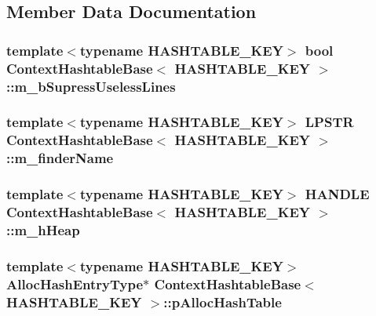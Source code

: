 \subsection{Member Data Documentation}
\hypertarget{class_context_hashtable_base_a5cfe6a5ef2651d399a5b5a9b7d4f2b3d}{
\subsubsection[{m\-\_\-b\-Supress\-Useless\-Lines}]{\setlength{\rightskip}{0pt plus 5cm}template$<$typename H\-A\-S\-H\-T\-A\-B\-L\-E\-\_\-\-K\-E\-Y$>$ bool {\bf Context\-Hashtable\-Base}$<$ H\-A\-S\-H\-T\-A\-B\-L\-E\-\_\-\-K\-E\-Y $>$\-::m\-\_\-b\-Supress\-Useless\-Lines}}\label{class_context_hashtable_base_a5cfe6a5ef2651d399a5b5a9b7d4f2b3d}
\hypertarget{class_context_hashtable_base_ab01c5068209ba7f43ee1f8670f79c837}{
\subsubsection[{m\-\_\-finder\-Name}]{\setlength{\rightskip}{0pt plus 5cm}template$<$typename H\-A\-S\-H\-T\-A\-B\-L\-E\-\_\-\-K\-E\-Y$>$ L\-P\-S\-T\-R {\bf Context\-Hashtable\-Base}$<$ H\-A\-S\-H\-T\-A\-B\-L\-E\-\_\-\-K\-E\-Y $>$\-::m\-\_\-finder\-Name}}\label{class_context_hashtable_base_ab01c5068209ba7f43ee1f8670f79c837}
\hypertarget{class_context_hashtable_base_abd63115983bd666ee0cb09bc684ada65}{
\subsubsection[{m\-\_\-h\-Heap}]{\setlength{\rightskip}{0pt plus 5cm}template$<$typename H\-A\-S\-H\-T\-A\-B\-L\-E\-\_\-\-K\-E\-Y$>$ H\-A\-N\-D\-L\-E {\bf Context\-Hashtable\-Base}$<$ H\-A\-S\-H\-T\-A\-B\-L\-E\-\_\-\-K\-E\-Y $>$\-::m\-\_\-h\-Heap}}\label{class_context_hashtable_base_abd63115983bd666ee0cb09bc684ada65}
\hypertarget{class_context_hashtable_base_a22aba6b9cc816a9c69820dae9e06e5e2}{
\subsubsection[{p\-Alloc\-Hash\-Table}]{\setlength{\rightskip}{0pt plus 5cm}template$<$typename H\-A\-S\-H\-T\-A\-B\-L\-E\-\_\-\-K\-E\-Y$>$ Alloc\-Hash\-Entry\-Type$\ast$ {\bf Context\-Hashtable\-Base}$<$ H\-A\-S\-H\-T\-A\-B\-L\-E\-\_\-\-K\-E\-Y $>$\-::p\-Alloc\-Hash\-Table}}\label{class_context_hashtable_base_a22aba6b9cc816a9c69820dae9e06e5e2}
